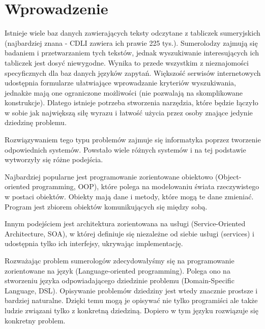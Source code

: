 \chapter*{Wprowadzenie}


Istnieje wiele baz danych zawierających teksty odczytane z tabliczek sumeryjskich (najbardziej znana - CDLI zawiera ich prawie 225 tys.). Sumerolodzy zajmują się badaniem i przetwarzaniem tych tekstów, jednak wyszukiwanie interesujących ich tabliczek jest dosyć niewygodne. Wynika to przede wszystkim z nieznajomości specyficznych dla baz danych języków zapytań. 
Większość serwisów internetowych udostępnia formularze ułatwiające wprowadzanie kryteriów wyszukiwania, jednakże mają one ograniczone możliwości (nie pozwalają na skomplikowane konstrukcje). Dlatego istnieje potrzeba stworzenia narzędzia, które będzie łączyło w sobie jak największą siłę wyrazu i łatwość użycia przez osoby znające jedynie dziedzinę problemu.

Rozwiązywaniem tego typu problemów zajmuje się informatyka poprzez tworzenie odpowiednich systemów. Powstało wiele różnych systemów i na tej podstawie wytworzyły się różne podejścia. %

Najbardziej popularne jest programowanie zorientowane obiektowo (Object-oriented programming, OOP), które polega na modelowaniu świata rzeczywistego w postaci obiektów. Obiekty mają dane i metody, które mogą te dane zmieniać. Program jest zbiorem obiektów komunikujących się między sobą. 

Innym podejściem jest architektura zorientowana na usługi (Service-Oriented Architecture, SOA), w której definiuje się niezależne od siebie usługi (services) i udostępnia tylko ich interfejsy, ukrywając implementację.

Rozważając problem sumerologów zdecydowałyśmy się na programowanie zorientowane na język (Language-oriented programming). Polega ono na stworzeniu języka odpowiadającego dziedzinie problemu (Domain-Specific Language, DSL). Opisywanie problemów dziedziny jest wtedy znacznie prostsze i bardziej naturalne. Dzięki temu mogą je opisywać nie tylko programiści ale także ludzie związani tylko z konkretną dziedziną. Dopiero w tym języku rozwiązuje się konkretny problem. 

